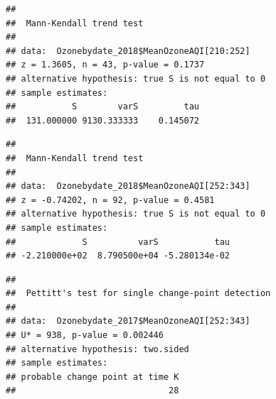 \documentclass[12pt,]{article}
\newenvironment{Shaded}{\begin{snugshade}}{\end{snugshade}}
\newcommand{\KeywordTok}[1]{\textcolor[rgb]{0.13,0.29,0.53}{\textbf{#1}}}
\newcommand{\DecValTok}[1]{\textcolor[rgb]{0.00,0.00,0.81}{#1}}
\newcommand{\CommentTok}[1]{\textcolor[rgb]{0.56,0.35,0.01}{\textit{#1}}}
\newcommand{\OperatorTok}[1]{\textcolor[rgb]{0.81,0.36,0.00}{\textbf{#1}}}
\newcommand{\NormalTok}[1]{#1}
\begin{document}
\begin{Shaded}
\end{Shaded}

\begin{verbatim}
## 
##  Mann-Kendall trend test
## 
## data:  Ozonebydate_2018$MeanOzoneAQI[210:252]
## z = 1.3605, n = 43, p-value = 0.1737
## alternative hypothesis: true S is not equal to 0
## sample estimates:
##           S        varS         tau 
##  131.000000 9130.333333    0.145072
\end{verbatim}

\begin{Shaded}
\end{Shaded}

\begin{verbatim}
## 
##  Mann-Kendall trend test
## 
## data:  Ozonebydate_2018$MeanOzoneAQI[252:343]
## z = -0.74202, n = 92, p-value = 0.4581
## alternative hypothesis: true S is not equal to 0
## sample estimates:
##             S          varS           tau 
## -2.210000e+02  8.790500e+04 -5.280134e-02
\end{verbatim}

\begin{Shaded}
\end{Shaded}

\begin{verbatim}
## 
##  Pettitt's test for single change-point detection
## 
## data:  Ozonebydate_2017$MeanOzoneAQI[252:343]
## U* = 938, p-value = 0.002446
## alternative hypothesis: two.sided
## sample estimates:
## probable change point at time K 
##                              28
\end{verbatim}
\end{document}
